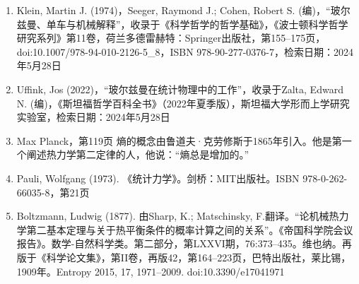 \begin{enumerate}
\item Klein, Martin J. (1974)，Seeger, Raymond J.; Cohen, Robert S. (编)，“玻尔兹曼、单车与机械解释”，收录于《科学哲学的哲学基础》，《波士顿科学哲学研究系列》第11卷，荷兰多德雷赫特：Springer出版社，第155–175页，doi:10.1007/978-94-010-2126-5_8，ISBN 978-90-277-0376-7，检索日期：2024年5月28日  
\item Uffink, Jos (2022)，“玻尔兹曼在统计物理中的工作”，收录于Zalta, Edward N. (编)，《斯坦福哲学百科全书》（2022年夏季版），斯坦福大学形而上学研究实验室，检索日期：2024年5月28日  
\item Max Planck，第119页  
熵的概念由鲁道夫·克劳修斯于1865年引入。他是第一个阐述热力学第二定律的人，他说：“熵总是增加的。”  
\item Pauli, Wolfgang (1973). 《统计力学》。剑桥：MIT出版社。ISBN 978-0-262-66035-8，第21页  
\item Boltzmann, Ludwig (1877). 由Sharp, K.; Matschinsky, F.翻译。“论机械热力学第二基本定理与关于热平衡条件的概率计算之间的关系”。《帝国科学院会议报告》。数学-自然科学类。第二部分，第LXXVI期，76:373–435。维也纳。再版于《科学论文集》，第II卷，再版42，第164–223页，巴特出版社，莱比锡，1909年。Entropy 2015, 17, 1971–2009. doi:10.3390/e17041971
\end{enumerate}